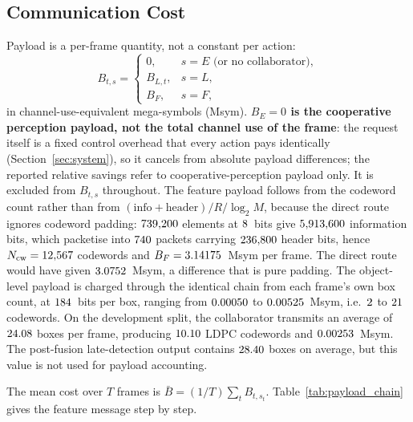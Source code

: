 \documentclass[journal]{IEEEtran}
\begin{document}
\subsection{Communication Cost}\label{sec:communication_cost}
Payload is a per-frame quantity, not a constant per action:
\begin{equation}
B_{t,s} =
\begin{cases}
0, & s = E \text{ (or no collaborator)},\\
B_{L,t}, & s = L,\\
B_F, & s = F,
\end{cases}
\label{eq:payload}
\end{equation}
in channel-use-equivalent mega-symbols (Msym). \textbf{$B_E = 0$ is the cooperative perception
payload, not the total channel use of the frame}: the request itself is a fixed control overhead
that every action pays identically (Section~\ref{sec:system}), so it cancels from absolute payload
differences; the
reported relative savings refer to cooperative-perception payload only. It is excluded from
$B_{t,s}$ throughout. The feature payload follows from the
codeword count
rather than from $(\text{info} + \text{header})/R/\log_2 M$, because the direct route ignores
codeword padding: $739{,}200$ elements at $8$~bits give $5{,}913{,}600$ information bits,
which packetise into $740$ packets carrying $236{,}800$ header bits, hence
$N_{\mathrm{cw}} = 12{,}567$ codewords and $B_F = 3.14175$~Msym per frame. The direct route would have
given $3.0752$~Msym, a difference that is pure padding. The object-level payload is charged
through the identical chain from each frame's own box count, at $184$~bits per box, ranging
from $0.00050$ to $0.00525$~Msym, i.e.\ $2$ to $21$ codewords. On the development
split, the collaborator transmits an average of $24.08$ boxes per frame, producing $10.10$ LDPC codewords and
$0.00253$~Msym. The post-fusion late-detection output contains $28.40$ boxes on
average, but this value is not used for payload accounting.

The mean cost over $T$ frames is $\bar B = (1/T)\sum_t B_{t,s_t}$. Table~\ref{tab:payload_chain}
gives the feature message step by step.

\begin{table}[t]
\caption{The feature message's payload, step by step. Every entry is a counted quantity; the last
row is the direct route $(\text{info}+\text{header})/R/\log_2 M$, which differs because it assumes
the information bits fill an integer number of codewords.}
\label{tab:payload_chain}
\centering\footnotesize\setlength{\tabcolsep}{4pt}

\end{table}
\end{document}
